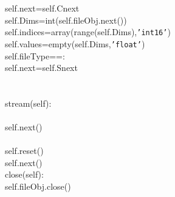 {{\begin{tabbing}
$$\hspace{72pt}self.next\hspace{6pt}=\hspace{6pt}self.Cnext\\
\hspace{72pt}self.Dims\hspace{6pt}=\hspace{6pt}int(self.fileObj.next())\\
\hspace{72pt}self.indices\hspace{6pt}=\hspace{6pt}array(range(self.Dims),{\texttt{{'}int16{'}}})\hspace{6pt}\\
\hspace{72pt}self.values\hspace{6pt}=\hspace{6pt}empty(self.Dims,{\texttt{{'}float{'}}})\hspace{6pt}\\
\hspace{6pt}self.fileType\hspace{6pt}==:\\
\hspace{72pt}self.next\hspace{6pt}=\hspace{6pt}self.Snext\\
\\
\\
\hspace{6pt}stream(self):\\
\\
\hspace{6pt}self.next()\\
\\
\hspace{72pt}self.reset()\\
\hspace{6pt}self.next()\\
\hspace{6pt}close(self):\\
\hspace{48pt}self.fileObj.close()
\end{tabbing}}}
